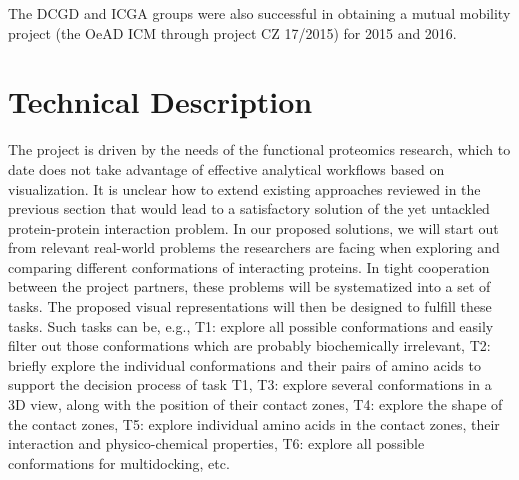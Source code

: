 \documentclass[11pt,a4paper,titlepage,oneside,onecolumn]{article}
\begin{document}
The DCGD and ICGA groups were also successful in obtaining a mutual mobility project (the OeAD ICM through project CZ 17/2015) for 2015 and 2016.


\section{Technical Description}
\label{sec:TechnicalDescription}
The project is driven by the needs of the functional proteomics research, which to date does not take advantage of effective analytical workflows based on visualization.
It is unclear how to extend existing approaches reviewed in the previous section that would lead to a satisfactory solution of the yet untackled protein-protein interaction problem.
In our proposed solutions, we will start out from relevant real-world problems the researchers are facing when exploring and comparing different conformations of interacting proteins.
In tight cooperation between the project partners, these problems will be systematized into a set of tasks. 
The proposed visual representations will then be designed to fulfill these tasks.
Such tasks can be, e.g., T1: explore all possible conformations and easily filter out those conformations which are probably biochemically irrelevant, T2: briefly explore the individual conformations and their pairs of amino acids to support the decision process of task T1, T3: explore several conformations in a 3D view, along with the position of their contact zones, T4: explore the shape of the contact zones, T5: explore individual amino acids in the contact zones, their interaction and physico-chemical properties, T6: explore all possible conformations for multidocking, etc.
\end{document}
